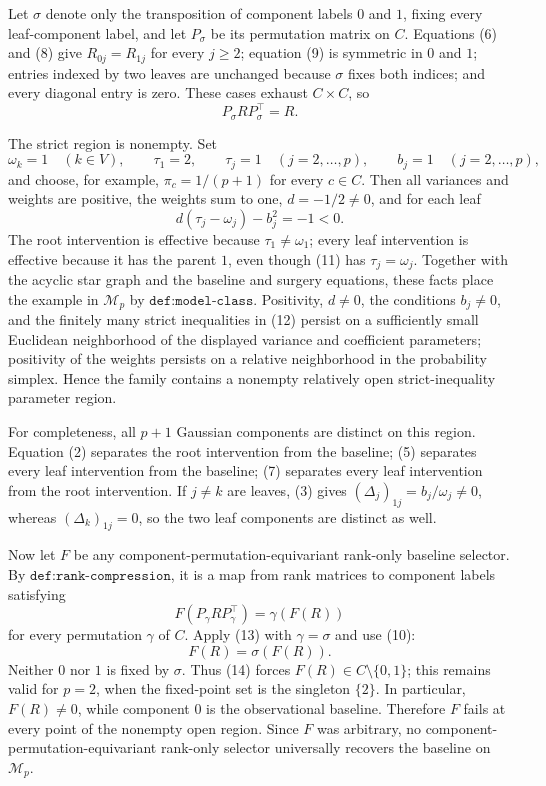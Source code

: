 Let \(\sigma\) denote only the transposition of component labels \(0\) and \(1\), fixing every leaf-component label, and let \(P_\sigma\) be its permutation matrix on \(C\).  Equations (6) and (8) give \(R_{0j}=R_{1j}\) for every \(j\geq2\); equation (9) is symmetric in \(0\) and \(1\); entries indexed by two leaves are unchanged because \(\sigma\) fixes both indices; and every diagonal entry is zero.  These cases exhaust \(C\times C\), so
\[
 P_\sigma R P_\sigma^{\top}=R.
 \tag{10}
\]

The strict region is nonempty.  Set
\[
 \omega_k=1\quad(k\in V),\qquad
 \tau_1=2,\qquad
 \tau_j=1\quad(j=2,\ldots,p),\qquad
 b_j=1\quad(j=2,\ldots,p),
 \tag{11}
\]
and choose, for example, \(\pi_c=1/(p+1)\) for every \(c\in C\).  Then all variances and weights are positive, the weights sum to one, \(d=-1/2\neq0\), and for each leaf
\[
 d(\tau_j-\omega_j)-b_j^2=-1<0.
 \tag{12}
\]
The root intervention is effective because \(\tau_1\neq\omega_1\); every leaf intervention is effective because it has the parent \(1\), even though (11) has \(\tau_j=\omega_j\).  Together with the acyclic star graph and the baseline and surgery equations, these facts place the example in \(\mathcal M_p\) by \(\texttt{def:model-class}\).  Positivity, \(d\neq0\), the conditions \(b_j\neq0\), and the finitely many strict inequalities in (12) persist on a sufficiently small Euclidean neighborhood of the displayed variance and coefficient parameters; positivity of the weights persists on a relative neighborhood in the probability simplex.  Hence the family contains a nonempty relatively open strict-inequality parameter region.

For completeness, all \(p+1\) Gaussian components are distinct on this region.  Equation (2) separates the root intervention from the baseline; (5) separates every leaf intervention from the baseline; (7) separates every leaf intervention from the root intervention.  If \(j\neq k\) are leaves, (3) gives \((\Delta_j)_{1j}=b_j/\omega_j\neq0\), whereas \((\Delta_k)_{1j}=0\), so the two leaf components are distinct as well.

Now let \(F\) be any component-permutation-equivariant rank-only baseline selector.  By \(\texttt{def:rank-compression}\), it is a map from rank matrices to component labels satisfying
\[
 F(P_\gamma R P_\gamma^{\top})=\gamma(F(R))
 \tag{13}
\]
for every permutation \(\gamma\) of \(C\).  Apply (13) with \(\gamma=\sigma\) and use (10):
\[
 F(R)=\sigma(F(R)).
 \tag{14}
\]
Neither \(0\) nor \(1\) is fixed by \(\sigma\).  Thus (14) forces \(F(R)\in C\setminus\{0,1\}\); this remains valid for \(p=2\), when the fixed-point set is the singleton \(\{2\}\).  In particular, \(F(R)\neq0\), while component \(0\) is the observational baseline.  Therefore \(F\) fails at every point of the nonempty open region.  Since \(F\) was arbitrary, no component-permutation-equivariant rank-only selector universally recovers the baseline on \(\mathcal M_p\).

